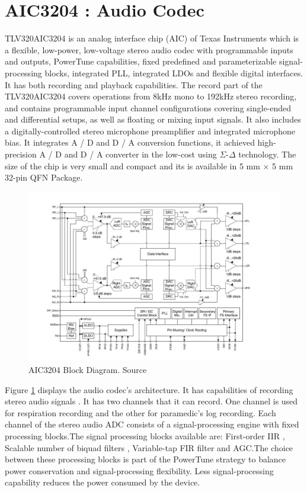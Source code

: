 \section{AIC3204 : Audio Codec}
TLV320AIC3204 is an analog interface chip (AIC) of Texas Instruments which is a flexible, low-power, low-voltage stereo audio codec with programmable inputs and outputs, PowerTune capabilities, fixed predefined and parameterizable signal-processing blocks, integrated PLL, integrated LDOs and flexible digital interfaces.  It has both recording and playback capabilities. The record part of the TLV320AIC3204 covers operations from 8kHz mono to 192kHz stereo recording, and contains programmable input channel configurations covering single-ended and differential setups, as well as floating or mixing input signals. It also includes a digitally-controlled stereo microphone preamplifier and integrated microphone bias. It integrates A / D and D / A conversion functions, it achieved high-precision A / D and D / A converter in the low-cost using $\Sigma$-$\Delta$ technology. The size of the chip is very small and compact and its is available in  5 mm × 5 mm 32-pin QFN Package. 

\begin{figure}[h]
	\centering
	\includegraphics[scale = 0.5 ]{AIC3204.JPG}
	\caption{AIC3204 Block Diagram. Source \cite{audiocodec}\label{aic3204}}
\end{figure}

Figure \ref{aic3204} displays the audio codec's architecture. It has capabilities of recording stereo audio signals . It has two channels that it can record. One channel is used for respiration recording and the other for paramedic's log recording.
Each
channel of the stereo audio ADC consists of a signal-processing engine with fixed processing blocks.The signal processing blocks available are:
First-order IIR
, Scalable number of biquad filters
, Variable-tap FIR filter
and AGC.The choice between these processing blocks is part of the PowerTune strategy to balance power
conservation and signal-processing flexibility. Less signal-processing capability reduces the power
consumed by the device.
